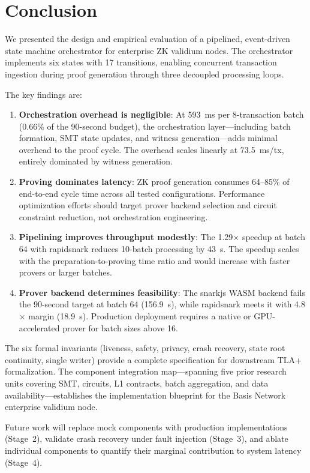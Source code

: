 
\section{Conclusion}

We presented the design and empirical evaluation of a pipelined, event-driven
state machine orchestrator for enterprise ZK validium nodes. The orchestrator
implements six states with 17 transitions, enabling concurrent transaction
ingestion during proof generation through three decoupled processing loops.

The key findings are:

\begin{enumerate}
\item \textbf{Orchestration overhead is negligible}: At 593~ms per
  8-transaction batch (0.66\% of the 90-second budget), the orchestration
  layer---including batch formation, SMT state updates, and witness
  generation---adds minimal overhead to the proof cycle. The overhead
  scales linearly at 73.5~ms/tx, entirely dominated by witness generation.

\item \textbf{Proving dominates latency}: ZK proof generation consumes
  64--85\% of end-to-end cycle time across all tested configurations.
  Performance optimization efforts should target prover backend selection
  and circuit constraint reduction, not orchestration engineering.

\item \textbf{Pipelining improves throughput modestly}: The 1.29$\times$
  speedup at batch 64 with rapidsnark reduces 10-batch processing by
  43~s. The speedup scales with the preparation-to-proving time ratio
  and would increase with faster provers or larger batches.

\item \textbf{Prover backend determines feasibility}: The snarkjs WASM
  backend fails the 90-second target at batch 64 (156.9~s), while
  rapidsnark meets it with 4.8$\times$ margin (18.9~s). Production
  deployment requires a native or GPU-accelerated prover for batch
  sizes above 16.
\end{enumerate}

The six formal invariants (liveness, safety, privacy, crash recovery,
state root continuity, single writer) provide a complete specification
for downstream TLA+ formalization. The component integration map---spanning
five prior research units covering SMT, circuits, L1 contracts, batch
aggregation, and data availability---establishes the implementation
blueprint for the Basis Network enterprise validium node.

Future work will replace mock components with production implementations
(Stage~2), validate crash recovery under fault injection (Stage~3), and
ablate individual components to quantify their marginal contribution to
system latency (Stage~4).
